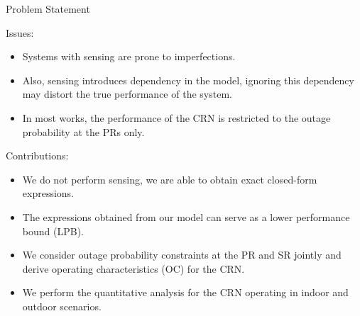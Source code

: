 \documentclass[12pt]{beamer}
\newcommand{\fs}[1]{\fontsize{ #1 pt}{8.2}\selectfont}
\begin{document}
\begin{frame}{Problem Statement}
\begin{overlayarea}{\textwidth}{2.8cm}
{\begin{itemize}
			\end{itemize}	
		}
		{
			Issues:
			\fs{8}
			\begin{itemize}
				\item Systems with sensing are prone to imperfections. 
				\item Also, sensing introduces dependency in the model, ignoring this dependency may distort the true performance of the system.
				\item In most works, the performance of the CRN is restricted to the outage probability at the PRs only. 
			\end{itemize}
		}
		{
			Contributions:
		       	\fs{8}
			\begin{itemize}
				 \item We do not perform sensing, we are able to obtain exact closed-form expressions. 
				 \item The expressions obtained from our model can serve as a lower performance bound (LPB). 
				 \item We consider outage probability constraints at the PR and SR jointly and derive operating characteristics (OC) for the CRN.
 				 \item We perform the quantitative analysis for the CRN operating in indoor and outdoor scenarios. 
			\end{itemize}	
		}
		\end{overlayarea}
	
	{
	}
	\only<2>
	{
	}
	\only<3>
	{
	}
\end{frame}
\end{document}

